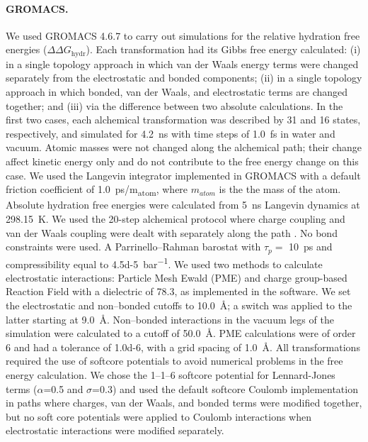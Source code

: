 \documentclass[journal=jctcce,manuscript=article]{achemso}
\begin{document}
\paragraph{GROMACS.} We used GROMACS 4.6.7 to carry out simulations for 
the relative hydration free energies ($\Delta \Delta G_{\mathrm{hydr}}$).
Each transformation had its Gibbs free energy calculated: (i) in a single 
topology approach in which van der Waals energy terms were changed separately 
from the electrostatic and bonded components; (ii) in a single topology 
approach in which bonded, van der Waals, and electrostatic terms are changed 
together;  and (iii) via the difference between two absolute calculations.
In the first two cases, each alchemical transformation was described by 31 and 
16 states, respectively, and simulated for \SI{4.2}{ns} with time steps of 
\SI{1.0}{fs} in water and vacuum. Atomic masses were not changed along the 
alchemical path; their change affect kinetic energy only and do not 
contribute to the free energy change on this case. 
We used the Langevin integrator implemented in GROMACS with a 
default friction coefficient of \SI{1.0}{ps/m_{atom}}, where $m_{atom}$
is the the mass of the atom.  Absolute hydration 
free energies were calculated from \SI{5}{ns} Langevin dynamics
at \SI{298.15}{K}. We used the 20-step alchemical protocol where 
charge coupling and van der Waals coupling were dealt with separately 
along the path \cite{Mobley2014, doi:10.1021/acs.jced.7b00104}.
No bond constraints were used. 
A Parrinello--Rahman barostat with $\tau_p =$ \SI{10}{ps} and compressibility 
equal to \SI{4.5d-5}{bar^{-1}}.
We used two methods to calculate electrostatic interactions: Particle Mesh 
Ewald (PME) and charge group-based Reaction Field with a dielectric of 78.3, 
as implemented in the software. 
We set the electrostatic and non--bonded cutoffs to \SI{10.0}{\angstrom};
a switch was applied to the latter starting at \SI{9.0}{\angstrom}. 
Non--bonded interactions in the vacuum legs of the simulation were calculated
to a cutoff of \SI{50.0}{\angstrom}. 
PME calculations were of order 6 and had a 
tolerance of \num{1.0d-6}, with a grid spacing of \SI{1.0}{\angstrom}. 
All transformations required the use of softcore potentials to avoid numerical 
problems in the free energy calculation.  We chose the 1--1--6 softcore 
potential for Lennard-Jones terms ($\alpha$=0.5 and $\sigma$=0.3) 
and used the default softcore Coulomb implementation in paths where 
charges, van der Waals, and bonded terms were modified together, 
but no soft core potentials were applied to Coulomb interactions when 
electrostatic interactions were modified separately.
\end{document}
